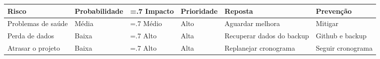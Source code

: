 \begin{table}[h!]
    \begin{tabularx}{\textwidth}{|X|>{\hsize=1.3\hsize}X|>{\hsize=.7\hsize}X|X|X|X|}
        \hline
        \textbf{Risco} & \textbf{Probabilidade} & \textbf{Impacto} & \textbf{Prioridade} & \textbf{Reposta} & \textbf{Prevenção} \\
        \hline
        Problemas de saúde & Média & Médio & Alto & Aguardar melhora & Mitigar \\
        \hline
        Perda de dados & Baixa & Alto & Alta & Recuperar dados do backup & Github e backup \\
        \hline
        Atrasar o projeto & Baixa & Alto & Alta & Replanejar cronograma & Seguir cronograma \\
        \hline
    \end{tabularx}
    \label{tab:table}
\end{table}